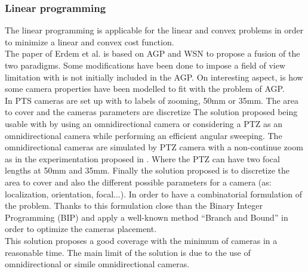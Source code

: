 	 \subsubsection{Linear programming}
	 The linear programming is applicable for the linear and convex problems in order to minimize a linear and convex cost function.\\
The paper of  Erdem et al. \cite{43*erdem2006} is based on AGP and  WSN to propose a fusion of the two paradigms. Some modifications have been done to impose  a  field of view limitation with is not initially included in the AGP. 
  On interesting aspect, is how some camera properties have been modelled to fit with the problem of AGP.  \\
In \cite{43*erdem2006} PTS cameras are set up  with  to labels  of zooming,  50mm or 35mm. The area to cover  and  the cameras parameters are discretize
The solution proposed being usable with  by using an omnidirectional camera or considering a PTZ as an omnidirectional camera while  performing an efficient angular sweeping. The omnidirectional cameras are simulated by PTZ camera with a non-continue zoom  as in the experimentation proposed in \cite{43*erdem2006}. Where the PTZ can have two focal lengths at 50mm and  35mm. 
Finally the solution proposed is to discretize the area to cover and also the different possible parameters for a camera (as: localization, orientation, focal...). In order to have a combinatorial formulation of the problem. Thanks to this formulation close than the Binary Integer Programming (BIP) and apply a well-known method “Branch and Bound” in order to optimize the cameras placement.  \\
This solution  proposes a  good  coverage with the minimum of cameras in a reasonable time. The main limit of the solution is due to  the  use of omnidirectional or simile omnidirectional cameras.%

